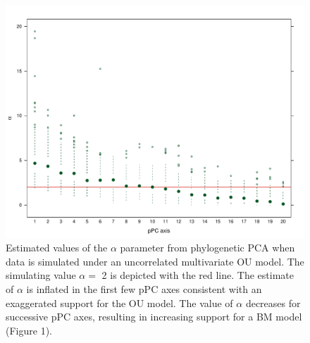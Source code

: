 \documentclass[12pt,twoside]{article}
\begin{document}
\begin{figure}[p]
\centering
\includegraphics[scale=0.65]{fig/alpha-est-uncor.pdf}
\caption[Estimates of the $\alpha$ parameter from phylogenetic PCA on uncorrelated OU]{Estimated values of the $\alpha$ parameter from phylogenetic PCA when data is simulated under an uncorrelated multivariate OU model. The simulating value $\alpha=$ 2 is depicted with the red line. The estimate of $\alpha$ is inflated in the first few pPC axes consistent with an exaggerated support for the OU model. The value of $\alpha$ decreases for successive pPC axes, resulting in increasing support for a BM model (Figure 1).}
\label{alpha-uncor}
\end{figure}
\end{document}
